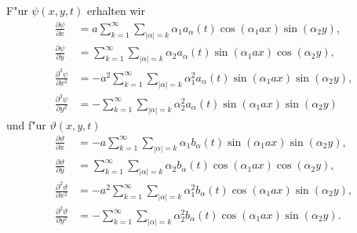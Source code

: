 F"ur $\psi(x,y,t)$ erhalten wir
\begin{align*}
\frac{\partial\psi}{\partial x}
&=
a
\sum_{k = 1}^{\infty}
\sum_{|\alpha| = k}
\alpha_1
a_{\alpha}(t)
\cos(\alpha_1 ax) \sin(\alpha_2 y),
\\
\frac{\partial\psi}{\partial y}
&=
\sum_{k = 1}^{\infty}
\sum_{|\alpha| = k}
\alpha_2
a_{\alpha}(t)
\sin(\alpha_1 ax) \cos(\alpha_2 y),
\\
\frac{\partial^2\psi}{\partial x^2}
&=
-
a^2
\sum_{k = 1}^{\infty}
\sum_{|\alpha| = k}
\alpha_1^2
a_{\alpha}(t)
\sin(\alpha_1 ax) \sin(\alpha_2 y),
\\
\frac{\partial^2\psi}{\partial y^2}
&=
-
\sum_{k = 1}^{\infty}
\sum_{|\alpha| = k}
\alpha_2^2
a_{\alpha}(t)
\sin(\alpha_1 ax) \sin(\alpha_2 y)
\end{align*}
und f"ur $\vartheta(x,y,t)$
\begin{align*}
\frac{\partial\vartheta}{\partial x}
&=
-
a
\sum_{k = 1}^{\infty}
\sum_{|\alpha| = k}
\alpha_1
b_{\alpha}(t)
\sin(\alpha_1 ax) \sin(\alpha_2 y),
\\
\frac{\partial\vartheta}{\partial y}
&=
\sum_{k = 1}^{\infty}
\sum_{|\alpha| = k}
\alpha_2
b_{\alpha}(t)
\cos(\alpha_1 ax) \cos(\alpha_2 y),
\\
\frac{\partial^2\vartheta}{\partial x^2}
&=
-
a^2
\sum_{k = 1}^{\infty}
\sum_{|\alpha| = k}
\alpha_1^2
b_{\alpha}(t)
\cos(\alpha_1 ax) \sin(\alpha_2 y),
\\
\frac{\partial^2\vartheta}{\partial y^2}
&=
-
\sum_{k = 1}^{\infty}
\sum_{|\alpha| = k}
\alpha_2^2
b_{\alpha}(t)
\cos(\alpha_1 ax) \sin(\alpha_2 y).
\end{align*}

